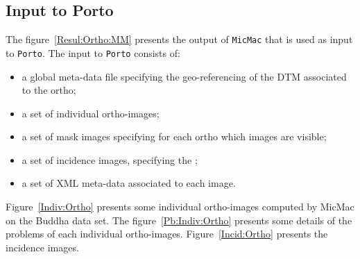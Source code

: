 
\subsection{Input to Porto}

The figure~\ref{Resul:Ortho:MM} presents the output of {\tt MicMac} that is used as
input to {\tt Porto}.
The input to {\tt Porto} consists of:

\begin{itemize}

   \item   a global meta-data  file specifying the geo-referencing of the
           DTM associated to the ortho;

  \item  a set of individual ortho-images;

  \item a set of mask images specifying for each ortho which images are visible;

  \item a set of incidence images, specifying the ;

  \item  a set of XML meta-data  associated to each image.
\end{itemize}


Figure~\ref{Indiv:Ortho} presents some individual ortho-images computed by MicMac on the
Buddha data set. The figure~\ref{Pb:Indiv:Ortho} presents some details of
the problems of each individual ortho-images. Figure~\ref{Incid:Ortho}
presents the incidence images. 






